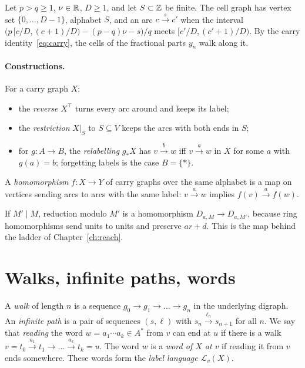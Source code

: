 \begin{example}\label{ex:cell}
Let \(p>q\ge1\), \(\nu\in\mathbb{R}\), \(D\ge1\), and let \(S\subset\mathbb{Z}\) be finite. The cell graph has
vertex set \(\{0,\dots,D-1\}\), alphabet \(S\), and an arc \(c\xrightarrow{s}c'\) when the
interval \(\bigl(p\,[c/D,(c+1)/D)-(p-q)\nu-s\bigr)/q\) meets \([c'/D,(c'+1)/D)\). By the
carry identity~\eqref{eq:carry}, the cells of the fractional parts \(y_n\) walk along it.
\end{example}

\paragraph{Constructions.} For a carry graph \(X\):
\begin{itemize}
\item the \emph{reverse} \(X^{\top}\) turns every arc around and keeps its label;
\item the \emph{restriction} \(X|_S\) to \(S\subseteq V\) keeps the arcs with both ends in
  \(S\);
\item for \(g\colon A\to B\), the \emph{relabelling} \(g_*X\) has \(v\xrightarrow{b}w\) iff
  \(v\xrightarrow{a}w\) in \(X\) for some \(a\) with \(g(a)=b\); forgetting labels is the case
  \(B=\{*\}\).
\end{itemize}
A \emph{homomorphism} \(f\colon X\to Y\) of carry graphs over the same alphabet is a map on
vertices sending arcs to arcs with the same label:
\(v\xrightarrow{a}w\) implies \(f(v)\xrightarrow{a}f(w)\).

\begin{example}\label{ex:proj}
If \(M'\mid M\), reduction modulo \(M'\) is a homomorphism \(D_{a,M}\to D_{a,M'}\), because ring
homomorphisms send units to units and preserve \(ar+d\). This is the map behind the ladder of
Chapter~\ref{ch:reach}.
\end{example}

\section{Walks, infinite paths, words}

A \emph{walk} of length \(n\) is a sequence \(g_0\to g_1\to\dots\to g_n\) in the underlying
digraph. An \emph{infinite path} is a pair of sequences \((s,\ell)\) with
\(s_n\xrightarrow{\ell_n}s_{n+1}\) for all \(n\). We say that \emph{reading} the word
\(w=a_1\cdots a_k\in A^*\) from \(v\) can end at \(u\) if there is a walk
\(v=t_0\xrightarrow{a_1}t_1\to\dots\xrightarrow{a_k}t_k=u\). The word \(w\) is a \emph{word of
\(X\) at \(v\)} if reading it from \(v\) ends somewhere. These words form the \emph{label
language} \(\mathcal L_v(X)\).


